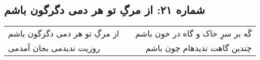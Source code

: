 \begin{center}
\section*{شماره ۲۱: از مرگِ تو هر دمی دگرگون باشم}
\label{sec:021}
\begin{longtable}{l p{0.5cm} r}
از مرگِ تو هر دمی دگرگون باشم
&&
گَه بر سرِ خاک و گاه در خون باشم
\\
روزیت ندیدمی بجان آمدمی
&&
چندین گاهت ندیدهام چون باشم
\\
\end{longtable}
\end{center}
